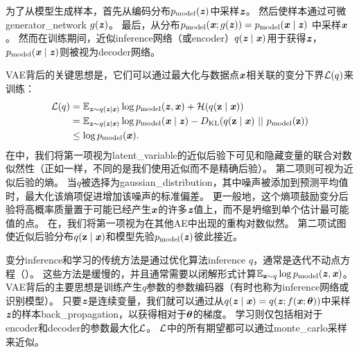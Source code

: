 为了从模型生成样本，首先从编码分布$p_{\text{model}}(\Vz)$中采样$\Vz$。
然后使样本通过可微\gls{generator_network} $g(\Vz)$。
最后，从分布$p_{\text{model}}(\Vx;g(\Vz)) = p_{\text{model}}(\Vx  \mid  \Vz)$ 中采样$\Vx$。
然而在训练期间，近似\gls{inference}网络（或\gls{encoder}）$q(\Vz  \mid  \Vx)$用于获得$\Vz$，$p_{\text{model}}(\Vx  \mid  \Vz)$则被视为\gls{decoder}网络。


\gls{VAE}背后的关键思想是，它们可以通过最大化与数据点$\Vx$相关联的变分下界$\CalL(q)$来训练：
\begin{align}
\CalL(q) &= \SetE_{\Vz \sim q(\Vz  \mid  \Vx)} \log p_{\text{model}} (\Vz, \Vx)
+ \CalH(q(\RVz  \mid  \Vx)) \label{eq:var_lower}  \\
&= \SetE_{\Vz \sim q(\Vz  \mid  \Vx)} \log p_{\text{model}} (\Vx  \mid  \Vz)
- D_{\text{KL}}(q(\RVz  \mid  \Vx) ~||~ p_{\text{model}}(\RVz)) \label{eq:var_kl} \\
& \leq \log p_{\text{model}}(\Vx).
\end{align}
在中，我们将第一项视为\gls{latent_variable}的近似后验下可见和隐藏变量的联合对数似然性（正如一样，不同的是我们使用近似而不是精确后验）。
第二项则可视为近似后验的熵。
当$q$被选择为\gls{gaussian_distribution}，其中噪声被添加到预测平均值时，最大化该熵项促进增加该噪声的标准偏差。
更一般地，这个熵项鼓励变分后验将高概率质量置于可能已经产生$\Vx$的许多$\Vz$值上，而不是坍缩到单个估计最可能值的点。
在，我们将第一项视为在其他\gls{AE}中出现的重构对数似然。
第二项试图使近似后验分布$q(\RVz  \mid  \Vx)$和模型先验$p_{\text{model}}(\Vz)$彼此接近。


变分\gls{inference}和学习的传统方法是通过优化算法\gls{inference} $q$，通常是迭代不动点方程（）。
这些方法是缓慢的，并且通常需要以闭解形式计算$\SetE_{\RVz \sim q} \log p_{\text{model}} (\Vz, \Vx)$。
\gls{VAE}背后的主要思想是训练产生$q$参数的参数编码器（有时也称为\gls{inference}网络或识别模型）。
只要$\Vz$是连续变量，我们就可以通过从$q(\Vz  \mid  \Vx) = q(\Vz; f(\Vx; \Vtheta))$中采样$\Vz$的样本\gls{back_propagation}，以获得相对于$\Vtheta$的梯度。
学习则仅包括相对于\gls{encoder}和\gls{decoder}的参数最大化$\CalL$。
$\CalL$中的所有期望都可以通过\gls{monte_carlo}采样来近似。


